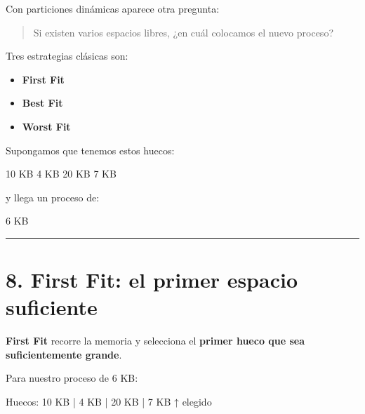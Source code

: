 \documentclass[
  spanish,
  letterpaper,
]{scrbook}
\newenvironment{Shaded}{\begin{snugshade}}{\end{snugshade}}
\newcommand{\NormalTok}[1]{\textcolor[rgb]{0.00,0.23,0.31}{#1}}
\providecommand{\tightlist}{%
  \setlength{\itemsep}{0pt}\setlength{\parskip}{0pt}}
\begin{document}
Con particiones dinámicas aparece otra pregunta:

\begin{quote}
Si existen varios espacios libres, ¿en cuál colocamos el nuevo proceso?
\end{quote}

Tres estrategias clásicas son:

\begin{itemize}
\tightlist
\item
  \textbf{First Fit}
\item
  \textbf{Best Fit}
\item
  \textbf{Worst Fit}
\end{itemize}

Supongamos que tenemos estos huecos:

\begin{Shaded}
\begin{Highlighting}[]
\NormalTok{10 KB   4 KB   20 KB   7 KB}
\end{Highlighting}
\end{Shaded}

y llega un proceso de:

\begin{Shaded}
\begin{Highlighting}[]
\NormalTok{6 KB}
\end{Highlighting}
\end{Shaded}

\begin{center}\rule{0.5\linewidth}{0.5pt}\end{center}


\chapter{8. First Fit: el primer espacio
suficiente}\label{first-fit-el-primer-espacio-suficiente}

\textbf{First Fit} recorre la memoria y selecciona el \textbf{primer
hueco que sea suficientemente grande}.

Para nuestro proceso de 6 KB:

\begin{Shaded}
\begin{Highlighting}[]
\NormalTok{Huecos: 10 KB | 4 KB | 20 KB | 7 KB}
\NormalTok{          ↑}
\NormalTok{       elegido}
\end{Highlighting}
\end{Shaded}
\end{document}
